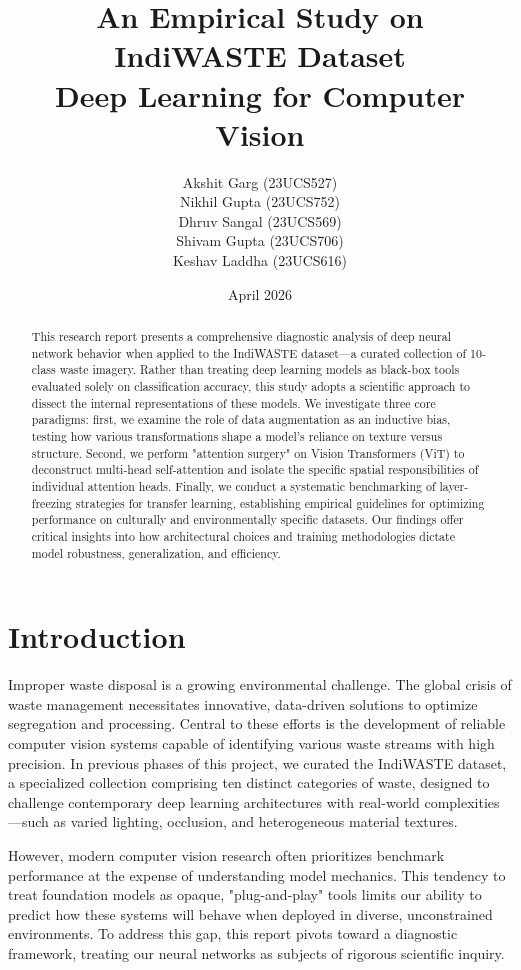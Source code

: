\documentclass[12pt,a4paper]{article}
\title{\textbf{An Empirical Study on IndiWASTE Dataset\\
\large Deep Learning for Computer Vision}}
\author{
    \vspace{1.5em}
    Akshit Garg (23UCS527) \\
    \vspace{0.5em}
    Nikhil Gupta (23UCS752) \\
    \vspace{0.5em}
    Dhruv Sangal (23UCS569) \\ 
    \vspace{0.5em} 
    Shivam Gupta (23UCS706) \\
    \vspace{0.5em}
    Keshav Laddha (23UCS616)
}
\affil{\vspace{2em} \textit{The LNM Institute of Information Technology, Jaipur}}
\date{April 2026}
\begin{document}
\maketitle

\begin{abstract}
This research report presents a comprehensive diagnostic analysis of deep neural network behavior when applied to the IndiWASTE dataset—a curated collection of 10-class waste imagery. Rather than treating deep learning models as black-box tools evaluated solely on classification accuracy, this study adopts a scientific approach to dissect the internal representations of these models. We investigate three core paradigms: first, we examine the role of data augmentation as an inductive bias, testing how various transformations shape a model's reliance on texture versus structure. Second, we perform "attention surgery" on Vision Transformers (ViT) to deconstruct multi-head self-attention and isolate the specific spatial responsibilities of individual attention heads. Finally, we conduct a systematic benchmarking of layer-freezing strategies for transfer learning, establishing empirical guidelines for optimizing performance on culturally and environmentally specific datasets. Our findings offer critical insights into how architectural choices and training methodologies dictate model robustness, generalization, and efficiency. 
\end{abstract}

\newpage

\section{Introduction}

Improper waste disposal is a growing environmental challenge. The global crisis of waste management necessitates innovative, data-driven solutions to optimize segregation and processing. Central to these efforts is the development of reliable computer vision systems capable of identifying various waste streams with high precision. In previous phases of this project, we curated the IndiWASTE dataset, a specialized collection comprising ten distinct categories of waste, designed to challenge contemporary deep learning architectures with real-world complexities—such as varied lighting, occlusion, and heterogeneous material textures.

\vspace{1em}

However, modern computer vision research often prioritizes benchmark performance at the expense of understanding model mechanics. This tendency to treat foundation models as opaque, "plug-and-play" tools limits our ability to predict how these systems will behave when deployed in diverse, unconstrained environments. To address this gap, this report pivots toward a diagnostic framework, treating our neural networks as subjects of rigorous scientific inquiry.
\end{document}
